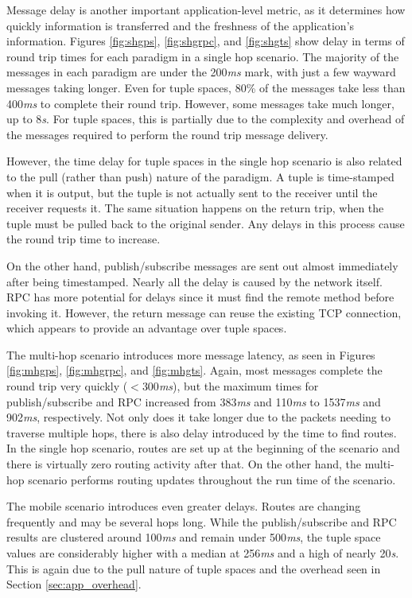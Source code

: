 Message delay is another important application-level metric, as it determines how quickly information is transferred and the freshness of the application's information. Figures \ref{fig:shgps}, \ref{fig:shgrpc}, and \ref{fig:shgts} show delay in terms of round trip times for each paradigm in a single hop scenario. The majority of the messages in each paradigm are under the 200\textit{ms} mark, with just a few wayward messages taking longer. Even for tuple spaces, 80\% of the messages take less than 400\textit{ms} to complete their round trip. However, some messages take much longer, up to 8\textit{s}. For tuple spaces, this is partially due to the complexity and overhead of the messages required to perform the round trip message delivery.

However, the time delay for tuple spaces in the single hop scenario is also related to the pull (rather than push) nature of the paradigm. A tuple is time-stamped when it is output, but the tuple is not actually sent to the receiver until the receiver requests it. The same situation happens on the return trip, when the tuple must be pulled back to the original sender. Any delays in this process cause the round trip time to increase.

On the other hand, publish/subscribe messages are sent out almost immediately after being timestamped. Nearly all the delay is caused by the network itself. RPC has more potential for delays since it must find the remote method before invoking it. However, the return message can reuse the existing TCP connection, which appears to provide an advantage over tuple spaces.

The multi-hop scenario introduces more message latency, as seen in Figures \ref{fig:mhgps}, \ref{fig:mhgrpc}, and \ref{fig:mhgts}. Again, most messages complete the round trip very quickly ($<$300\textit{ms}), but the maximum times for publish/subscribe and RPC increased from 383\textit{ms} and 110\textit{ms} to 1537\textit{ms} and 902\textit{ms}, respectively. Not only does it take longer due to the packets needing to traverse multiple hops, there is also delay introduced by the time to find routes. In the single hop scenario, routes are set up at the beginning of the scenario and there is virtually zero routing activity after that. On the other hand, the multi-hop scenario performs routing updates throughout the run time of the scenario.

The mobile scenario introduces even greater delays. Routes are changing frequently and may be several hops long. While the publish/subscribe and RPC results are clustered around 100\textit{ms} and remain under 500\textit{ms}, the tuple space values are considerably higher with a median at 256\textit{ms} and a high of nearly 20\textit{s}. This is again due to the pull nature of tuple spaces and the overhead seen in Section \ref{sec:app_overhead}.

